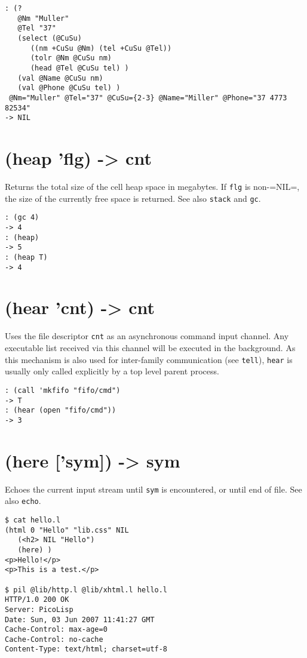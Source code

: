 {{{{{{\begin{verbatim}
: (?
   @Nm "Muller"
   @Tel "37"
   (select (@CuSu)
      ((nm +CuSu @Nm) (tel +CuSu @Tel))
      (tolr @Nm @CuSu nm)
      (head @Tel @CuSu tel) )
   (val @Name @CuSu nm)
   (val @Phone @CuSu tel) )
 @Nm="Muller" @Tel="37" @CuSu={2-3} @Name="Miller" @Phone="37 4773 82534"
-> NIL
\end{verbatim}

 
\section{(heap 'flg) -> cnt}
\label{sec-8-1-8-8}


Returns the total size of the cell heap space in megabytes. If \texttt{flg} is
non-=NIL=, the size of the currently free space is returned. See also
\texttt{stack} and \texttt{gc}.


\begin{verbatim}
: (gc 4)
-> 4
: (heap)
-> 5
: (heap T)
-> 4
\end{verbatim}

 
\section{(hear 'cnt) -> cnt}
\label{sec-8-1-8-9}


Uses the file descriptor \texttt{cnt} as an asynchronous command input channel.
Any executable list received via this channel will be executed in the
background. As this mechanism is also used for inter-family
communication (see \texttt{tell}), \texttt{hear} is usually only called explicitly by
a top level parent process.


\begin{verbatim}
: (call 'mkfifo "fifo/cmd")
-> T
: (hear (open "fifo/cmd"))
-> 3
\end{verbatim}

 
\section{(here ['sym]) -> sym}
\label{sec-8-1-8-10}


Echoes the current input stream until \texttt{sym} is encountered, or until end
of file. See also \texttt{echo}.


\begin{verbatim}
$ cat hello.l
(html 0 "Hello" "lib.css" NIL
   (<h2> NIL "Hello")
   (here) )
<p>Hello!</p>
<p>This is a test.</p>

$ pil @lib/http.l @lib/xhtml.l hello.l
HTTP/1.0 200 OK
Server: PicoLisp
Date: Sun, 03 Jun 2007 11:41:27 GMT
Cache-Control: max-age=0
Cache-Control: no-cache
Content-Type: text/html; charset=utf-8


\end{verbatim}}}}}}}
